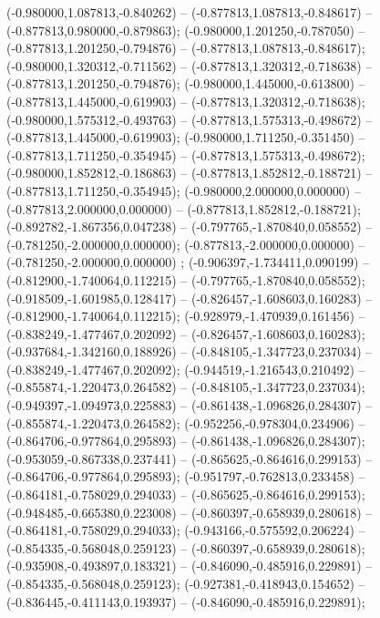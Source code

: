  (-0.980000,1.087813,-0.840262) -- (-0.877813,1.087813,-0.848617) -- (-0.877813,0.980000,-0.879863);
 (-0.980000,1.201250,-0.787050) -- (-0.877813,1.201250,-0.794876) -- (-0.877813,1.087813,-0.848617);
 (-0.980000,1.320312,-0.711562) -- (-0.877813,1.320312,-0.718638) -- (-0.877813,1.201250,-0.794876);
 (-0.980000,1.445000,-0.613800) -- (-0.877813,1.445000,-0.619903) -- (-0.877813,1.320312,-0.718638);
 (-0.980000,1.575312,-0.493763) -- (-0.877813,1.575313,-0.498672) -- (-0.877813,1.445000,-0.619903);
 (-0.980000,1.711250,-0.351450) -- (-0.877813,1.711250,-0.354945) -- (-0.877813,1.575313,-0.498672);
 (-0.980000,1.852812,-0.186863) -- (-0.877813,1.852812,-0.188721) -- (-0.877813,1.711250,-0.354945);
 (-0.980000,2.000000,0.000000) -- (-0.877813,2.000000,0.000000) -- (-0.877813,1.852812,-0.188721);
 (-0.892782,-1.867356,0.047238) -- (-0.797765,-1.870840,0.058552) -- (-0.781250,-2.000000,0.000000);
 (-0.877813,-2.000000,0.000000) -- (-0.781250,-2.000000,0.000000) ;
 (-0.906397,-1.734411,0.090199) -- (-0.812900,-1.740064,0.112215) -- (-0.797765,-1.870840,0.058552);
 (-0.918509,-1.601985,0.128417) -- (-0.826457,-1.608603,0.160283) -- (-0.812900,-1.740064,0.112215);
 (-0.928979,-1.470939,0.161456) -- (-0.838249,-1.477467,0.202092) -- (-0.826457,-1.608603,0.160283);
 (-0.937684,-1.342160,0.188926) -- (-0.848105,-1.347723,0.237034) -- (-0.838249,-1.477467,0.202092);
 (-0.944519,-1.216543,0.210492) -- (-0.855874,-1.220473,0.264582) -- (-0.848105,-1.347723,0.237034);
 (-0.949397,-1.094973,0.225883) -- (-0.861438,-1.096826,0.284307) -- (-0.855874,-1.220473,0.264582);
 (-0.952256,-0.978304,0.234906) -- (-0.864706,-0.977864,0.295893) -- (-0.861438,-1.096826,0.284307);
 (-0.953059,-0.867338,0.237441) -- (-0.865625,-0.864616,0.299153) -- (-0.864706,-0.977864,0.295893);
 (-0.951797,-0.762813,0.233458) -- (-0.864181,-0.758029,0.294033) -- (-0.865625,-0.864616,0.299153);
 (-0.948485,-0.665380,0.223008) -- (-0.860397,-0.658939,0.280618) -- (-0.864181,-0.758029,0.294033);
 (-0.943166,-0.575592,0.206224) -- (-0.854335,-0.568048,0.259123) -- (-0.860397,-0.658939,0.280618);
 (-0.935908,-0.493897,0.183321) -- (-0.846090,-0.485916,0.229891) -- (-0.854335,-0.568048,0.259123);
 (-0.927381,-0.418943,0.154652) -- (-0.836445,-0.411143,0.193937) -- (-0.846090,-0.485916,0.229891);
